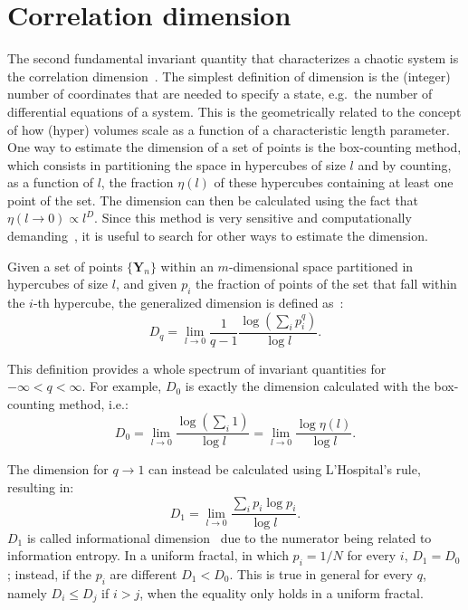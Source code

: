 \section{Correlation dimension}\label{sec: correlation dimension}

The second fundamental invariant quantity that characterizes a chaotic system is
the correlation dimension~\cite{ref:abarbanel_fourier_spectra}.
The simplest definition of dimension is the (integer) number of coordinates that are
needed to specify a state, e.g.\ the number of differential equations of a system.
This is the geometrically related to the concept of how (hyper) volumes scale as a
function of a characteristic length parameter.
One way to estimate the dimension of a set of points is the box-counting method, which consists in partitioning the space in
hypercubes of size $l$ and by counting, as a function of $l$, the fraction $\eta(l)$ of
these hypercubes containing at least one point of the set. The dimension can then be calculated
using the fact that $\eta(l\rightarrow0)\propto l^D$. Since this method is
very sensitive and computationally demanding~\cite{ref:greenside1982impracticality},
it is useful to search for other ways to estimate the dimension.

Given a set of points $\{\mathbf{Y}_n\}$ within an $m$-dimensional space partitioned in hypercubes
of size $l$, and given $p_i$
the fraction of points of the set that fall within the $i$-th hypercube,
the generalized dimension is defined as~\cite{ref:fractal_dim}:
\begin{equation}
    \label{eq: generalized dimension}
    D_q=\lim_{l\rightarrow0}\frac{1}{q-1}\frac{\log(\sum_i p_i^q)}{\log l}.
\end{equation}

This definition provides a whole spectrum of invariant quantities for $-\infty<q<\infty$.
For example, $D_0$ is exactly the dimension calculated with the box-counting method, i.e.:
\begin{equation}
    \label{eq: D_0}
    D_0=\lim_{l\rightarrow0}\frac{\log(\sum_i1)}{\log l}
    =\lim_{l\rightarrow0}\frac{\log\eta(l)}{\log l}.
\end{equation}

The dimension for $q\rightarrow1$ can instead be calculated using L'Hospital's rule, resulting in:
\begin{equation}
    \label{eq: D_1}
    D_1=\lim_{l\rightarrow0}\frac{\sum_i p_i\log p_i}{\log l}.
\end{equation}
$D_1$ is called informational dimension~\cite{ref:abarbanel_fourier_spectra} due to the numerator
being related to information entropy. In a uniform fractal, in which
$p_i=1/N$ for every $i$, $D_1=D_0$; instead, if the $p_i$ are different $D_1<D_0$.
This is true in general for every $q$, namely $D_i\leq D_j$ if $i>j$, when the equality only
holds in a uniform fractal.

